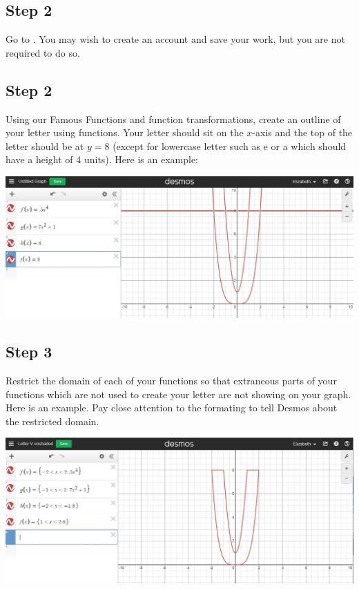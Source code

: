 \documentclass{ximera}
\begin{document}
\subsection{Step 2} Go to .  You may wish to create an account and save your work, but you are not required to do so.  

\subsection{Step 2} Using our Famous Functions and function transformations, create an outline of your letter using functions.  Your letter should sit on the $x$-axis and the top of the letter should be at $y=8$ (except for lowercase letter such as e or a which should have a height of 4 units).  Here is an example:

\begin{image}
\includegraphics[width=\textwidth]{outlinedLetterV.jpg}
\end{image}

\subsection{Step 3} Restrict the domain of each of your functions so that extraneous parts of your functions which are not used to create your letter are not showing on your graph. Here is an example.  Pay close attention to the formating to tell Desmos about the restricted domain. 

\begin{center}  
\end{center} 

\begin{image}
\includegraphics[width=\textwidth]{unshadedLetterV.jpg}
\end{image}
\end{document}
